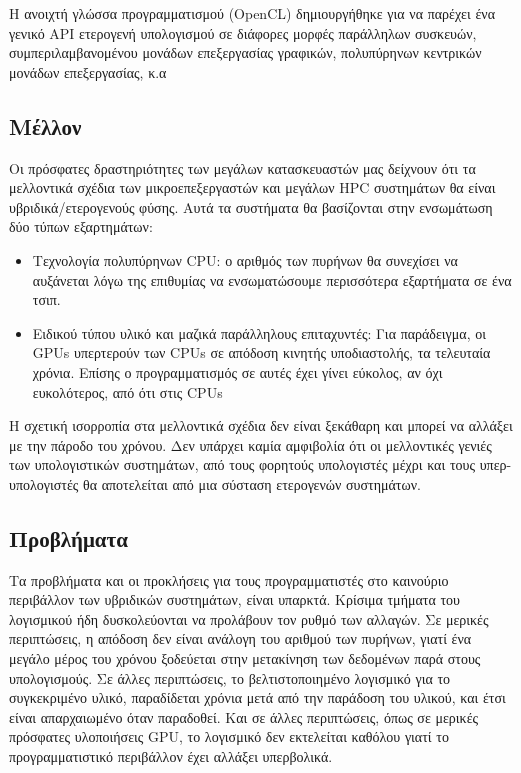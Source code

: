 Η ανοιχτή γλώσσα προγραμματισμού (OpenCL) δημιουργήθηκε για να παρέχει ένα γενικό API ετερογενή υπολογισμού σε διάφορες μορφές παράλληλων συσκευών, συμπεριλαμβανομένου μονάδων επεξεργασίας γραφικών, πολυπύρηνων κεντρικών μονάδων επεξεργασίας, κ.α
\subsection{Μέλλον}
Οι πρόσφατες δραστηριότητες των μεγάλων κατασκευαστών μας δείχνουν ότι τα μελλοντικά σχέδια των μικροεπεξεργαστών και μεγάλων HPC συστημάτων θα είναι υβριδικά/ετερογενούς φύσης. Αυτά τα συστήματα θα βασίζονται στην ενσωμάτωση δύο τύπων εξαρτημάτων:
\begin{itemize}
\item Τεχνολογία πολυπύρηνων CPU: ο αριθμός των πυρήνων θα συνεχίσει να αυξάνεται λόγω της επιθυμίας να ενσωματώσουμε περισσότερα εξαρτήματα σε ένα τσιπ.
\item Ειδικού τύπου υλικό και μαζικά παράλληλους επιταχυντές: Για παράδειγμα, οι GPUs υπερτερούν των CPUs σε απόδοση κινητής υποδιαστολής, τα τελευταία χρόνια. Επίσης ο προγραμματισμός σε αυτές έχει γίνει εύκολος, αν όχι ευκολότερος, από ότι στις CPUs
\end{itemize}
Η σχετική ισορροπία στα μελλοντικά σχέδια δεν είναι ξεκάθαρη και μπορεί να αλλάξει με την πάροδο του χρόνου. Δεν υπάρχει καμία αμφιβολία ότι οι μελλοντικές γενιές των υπολογιστικών συστημάτων, από τους φορητούς υπολογιστές μέχρι και τους υπερ-υπολογιστές θα αποτελείται από μια σύσταση ετερογενών συστημάτων. 
\subsection{Προβλήματα}
Τα προβλήματα και οι προκλήσεις για τους προγραμματιστές στο καινούριο περιβάλλον των υβριδικών συστημάτων, είναι υπαρκτά. Κρίσιμα τμήματα του λογισμικού ήδη δυσκολεύονται να προλάβουν τον ρυθμό των αλλαγών. Σε μερικές περιπτώσεις, η απόδοση δεν είναι ανάλογη του αριθμού των πυρήνων, γιατί ένα μεγάλο μέρος του χρόνου ξοδεύεται στην μετακίνηση των δεδομένων παρά στους υπολογισμούς. Σε άλλες περιπτώσεις, το βελτιστοποιημένο λογισμικό για το συγκεκριμένο υλικό, παραδίδεται χρόνια μετά από την παράδοση του υλικού, και έτσι είναι απαρχαιωμένο όταν παραδοθεί. Και σε άλλες περιπτώσεις, όπως σε μερικές πρόσφατες υλοποιήσεις GPU, το λογισμικό δεν εκτελείται καθόλου γιατί το προγραμματιστικό περιβάλλον έχει αλλάξει υπερβολικά.



